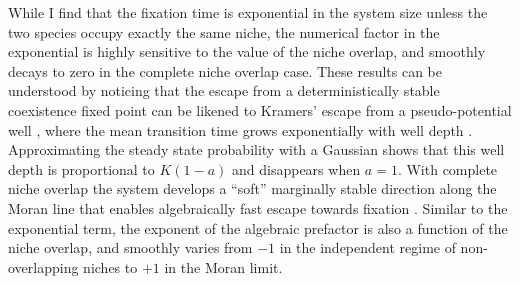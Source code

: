 While I find that the fixation time is exponential in the system size unless the two species occupy exactly the same niche, the numerical factor in the exponential is highly sensitive to the value of the niche overlap, and smoothly decays to zero in the complete niche overlap case. 
These results can be understood by noticing that the escape from a deterministically stable coexistence fixed point can be likened to Kramers' escape from a pseudo-potential well \cite{Bez1981,Hanggi1990,Ovaskainen2010,Dobrinevski2012}, where the mean transition time grows exponentially with well depth \cite{Ovaskainen2010}. %
Approximating the steady state probability with a Gaussian shows that this well depth is proportional to $K(1-a)$ and disappears when $a=1$. 
With complete niche overlap the system develops a ``soft'' marginally stable direction along the Moran line that enables algebraically fast escape towards fixation \cite{Dobrinevski2012,Chotibut2015}. 
Similar to the exponential term, the exponent of the algebraic prefactor is also a function of the niche overlap, and smoothly varies from $-1$ in the independent regime of non-overlapping niches to $+1$ in the Moran limit. 

